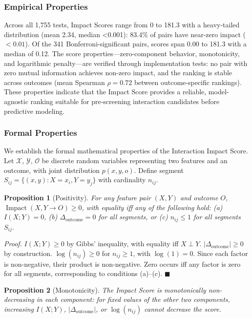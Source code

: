 \documentclass[conference]{IEEEtran}
\newtheorem{proposition}{Proposition}
\begin{document}
\subsubsection*{Empirical Properties}
Across all 1,755 tests, Impact Scores range from 0 to 181.3 with a heavy-tailed distribution (mean 2.34, median <0.001): 83.4\% of pairs have near-zero impact ($<0.01$). Of the 341 Bonferroni-significant pairs, scores span 0.00 to 181.3 with a median of 0.12. The score properties---zero-component behavior, monotonicity, and logarithmic penalty---are verified through implementation tests: no pair with zero mutual information achieves non-zero impact, and the ranking is stable across outcomes (mean Spearman $\rho = 0.72$ between outcome-specific rankings). These properties indicate that the Impact Score provides a reliable, model-agnostic ranking suitable for pre-screening interaction candidates before predictive modeling.

\subsubsection{Formal Properties}

We establish the formal mathematical properties of the Interaction Impact Score. Let $\mathcal{X}$, $\mathcal{Y}$, $\mathcal{O}$ be discrete random variables representing two features and an outcome, with joint distribution $p(x,y,o)$. Define segment $S_{ij} = \{(x,y): X=x_i, Y=y_j\}$ with cardinality $n_{ij}$.

\begin{proposition}[Positivity]
\label{prop:positivity}
For any feature pair $(X,Y)$ and outcome $O$, $\operatorname{Impact}(X,Y \to O) \geq 0$, with equality iff any of the following hold: (a) $I(X;Y) = 0$, (b) $\Delta_{\text{outcome}} = 0$ for all segments, or (c) $n_{ij} \leq 1$ for all segments $S_{ij}$.
\end{proposition}

\textit{Proof.} $I(X;Y) \geq 0$ by Gibbs' inequality, with equality iff $X \perp Y$. $|\Delta_{\text{outcome}}| \geq 0$ by construction. $\log(n_{ij}) \geq 0$ for $n_{ij} \geq 1$, with $\log(1)=0$. Since each factor is non-negative, their product is non-negative. Zero occurs iff any factor is zero for all segments, corresponding to conditions (a)--(c). \hfill $\blacksquare$

\begin{proposition}[Monotonicity]
\label{prop:monotonicity}
The Impact Score is monotonically non-decreasing in each component: for fixed values of the other two components, increasing $I(X;Y)$, $|\Delta_{\text{outcome}}|$, or $\log(n_{ij})$ cannot decrease the score.
\end{proposition}
\end{document}

